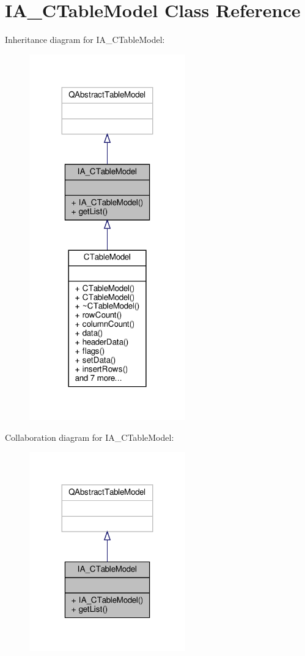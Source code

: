 \hypertarget{classIA__CTableModel}{}\section{I\+A\+\_\+\+C\+Table\+Model Class Reference}
\label{classIA__CTableModel}


Inheritance diagram for I\+A\+\_\+\+C\+Table\+Model\+:
\nopagebreak
\begin{figure}[H]
\begin{center}
\leavevmode
\includegraphics[width=191pt]{classIA__CTableModel__inherit__graph}
\end{center}
\end{figure}


Collaboration diagram for I\+A\+\_\+\+C\+Table\+Model\+:
\nopagebreak
\begin{figure}[H]
\begin{center}
\leavevmode
\includegraphics[width=191pt]{classIA__CTableModel__coll__graph}
\end{center}
\end{figure}
